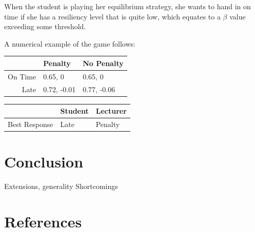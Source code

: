 \documentclass[11pt,preprint, authoryear]{elsarticle}
\let\origtable\table
\let\endorigtable\endtable
\renewenvironment{table}[1][2] {
    \expandafter\origtable\expandafter[H]
} {
    \endorigtable
}
\numberwithin{equation}{section}
\numberwithin{figure}{section}
\numberwithin{table}{section}
\begin{document}
When the student is playing her equilibrium strategy, she wants to hand
in on time if she has a resiliency level that is quite low, which
equates to a \(\beta\) value exceeding some threshold.

A numerical example of the game follows:

\begin{table}[H]
\centering
\begin{tabular}{rll}
  \toprule
 & Penalty & No Penalty \\ 
  \midrule
On Time & 0.65, 0 & 0.65, 0 \\ 
  Late & 0.72, -0.01 & 0.77, -0.06 \\ 
   \bottomrule
\end{tabular}
\caption{Simultaneous Game Best Response \label{tab2}} 
\end{table}
\begin{table}[H]
\centering
\begin{tabular}{rll}
  \toprule
 & Student & Lecturer \\ 
  \midrule
Best Response & Late & Penalty \\ 
   \bottomrule
\end{tabular}
\caption{Best Response\label{tab3}} 
\end{table}

\hypertarget{conclusion}{%
\section{\texorpdfstring{Conclusion
\label{con}}{Conclusion }}\label{conclusion}}

Extensions, generality Shortcomings \newpage

\hypertarget{references}{%
\section*{References}\label{references}}
\end{document}

